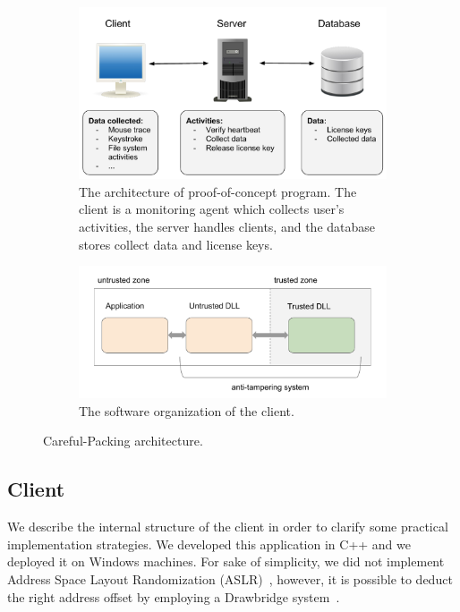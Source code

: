 \begin{figure}[t]
	\centering
	\begin{subfigure}[t]{0.45\textwidth}
		\centering
		\includegraphics[width=\linewidth]{fig_c3/architecture.pdf}
		\caption{The architecture of proof-of-concept program. The client is a 
		monitoring agent which collects user's activities, the server handles 
		clients, and the database stores collect data and license keys.}
		\label{fig:architecture}
	\end{subfigure}
	\hfill
	\begin{subfigure}[t]{0.45\textwidth}
		\centering
		\includegraphics[width=\textwidth]{fig_c3/clientarchitecture.pdf}
		\caption{The software organization of the client.}
		\label{fig:clientarchitecture}
	\end{subfigure}
	\caption{Careful-Packing architecture.}
\end{figure}

\subsection{Client}
We describe the internal structure of the client in order to clarify some 
practical implementation strategies.
We developed this application in C++ and we deployed it on Windows machines.
For sake of simplicity, we did not implement Address Space Layout Randomization 
(ASLR)~\citep{snow2013just}, however, it is possible to deduct the right 
address offset by employing a Drawbridge system~\citep{porter2011rethinking}.

